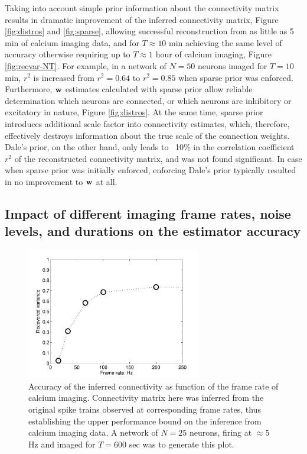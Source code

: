 Taking into account simple prior information about the connectivity matrix results in dramatic improvement of the inferred connectivity matrix, Figure \ref{fig:distros} and \ref{fig:sparse}, allowing successful reconstruction from as little as 5 min of calcium imaging data, and for $T\approx 10$ min achieving the same level of accuracy otherwise requiring up to $T\approx 1$ hour of calcium imaging, Figure \ref{fig:recvar-NT}. For example, in a network of $N=50$ neurons imaged for $T=10$ min, $r^2$ is increased from $r^2=0.64$ to $r^2=0.85$ when sparse prior was enforced. Furthermore, $\mathbf{w}$ estimates calculated with sparse prior allow reliable determination which neurons are connected, or which neurons are inhibitory or excitatory in nature, Figure \ref{fig:distros}. At the same time, sparse prior introduces additional scale factor into connectivity estimates, which, therefore, effectively destroys information about the true scale of the connection weights. Dale's prior, on the other hand, only leads to ~10\% in the correlation coefficient $r^2$ of the reconstructed connectivity matrix, and was not found significant. In case when sparse prior was initially enforced, enforcing Dale's prior typically resulted in no improvement to $\mathbf{w}$ at all.


\subsection{Impact of different imaging frame rates, noise levels, and durations on the estimator accuracy}

\begin{figure}[h]
\centering
\includegraphics[width=3in]{../figs/FigureA5_recvar}
\caption{Accuracy of the inferred connectivity as function of the frame rate of calcium imaging. Connectivity matrix here was inferred from the original spike trains observed at corresponding frame rates, thus establishing the upper performance bound on the inference from calcium imaging data. A network of $N=25$ neurons, firing at $\approx 5$ Hz and imaged for $T=600$ sec was to generate this plot.}
\label{fig:recvar}
\end{figure}

